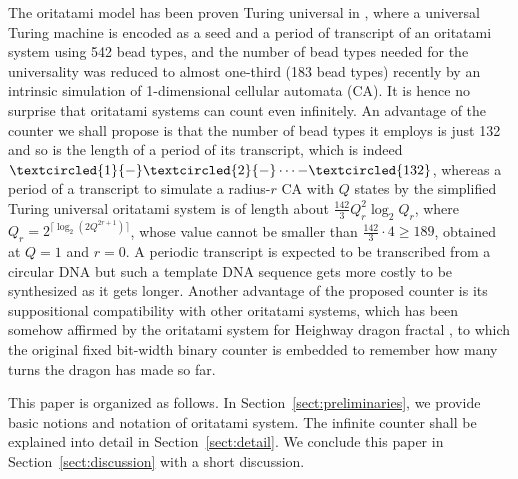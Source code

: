 \documentclass[twocolumn]{svjour3}
\begin{document}
The oritatami model has been proven Turing universal in \cite{GeMeScSe2018}, where a universal Turing machine is encoded as a seed and a period of transcript of an oritatami system using 542 bead types, and the number of bead types needed for the universality was reduced to almost one-third (183 bead types) recently \cite{PchelinaSSU2020} by an intrinsic simulation of 1-dimensional cellular automata (CA). 
It is hence no surprise that oritatami systems can count even infinitely. 
An advantage of the counter we shall propose is that the number of bead types it employs is just 132 and so is the length of a period of its transcript, which is indeed $\textcircled{\scriptsize 1}{-}\textcircled{\scriptsize 2}{-} \cdots {-}\textcircled{\tiny 132}$, whereas a period of a transcript to simulate a radius-$r$ CA with $Q$ states by the simplified Turing universal oritatami system is of length about $\frac{142}{3}Q_r^2 \log_2 Q_r$, where $Q_r = 2^{\lceil \log_2(2Q^{2r+1})\rceil}$, whose value cannot be smaller than $\frac{142}{3} \cdot 4 \ge 189$, obtained at $Q = 1$ and $r = 0$. %
A periodic transcript is expected to be transcribed from a circular DNA \cite{GearyAndersen2014} but such a template DNA sequence gets more costly to be synthesized as it gets longer. 
Another advantage of the proposed counter is its suppositional compatibility with other oritatami systems, which has been somehow affirmed by the oritatami system for Heighway dragon fractal \cite{MasudaSekiUbukata2018}, to which the original fixed bit-width binary counter is embedded to remember how many turns the dragon has made so far. 

This paper is organized as follows. 
In Section~\ref{sect:preliminaries}, we provide basic notions and notation of oritatami system. 
The infinite counter shall be explained into detail in Section~\ref{sect:detail}. 
We conclude this paper in Section~\ref{sect:discussion} with a short discussion. 
\end{document}
